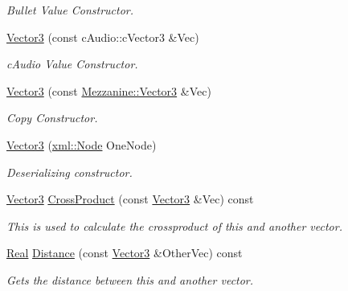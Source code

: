 \begin{DoxyCompactItemize}
\begin{DoxyCompactList}\small\item\em Bullet Value Constructor. \item\end{DoxyCompactList}\item 
\hyperlink{classMezzanine_1_1Vector3_ab6478bd78241583b76a112b6d2c4008f}{Vector3} (const cAudio::cVector3 \&Vec)
\begin{DoxyCompactList}\small\item\em cAudio Value Constructor. \item\end{DoxyCompactList}\item 
\hyperlink{classMezzanine_1_1Vector3_a778d067a1845e7b5fd0a1751c3187901}{Vector3} (const \hyperlink{classMezzanine_1_1Vector3}{Mezzanine::Vector3} \&Vec)
\begin{DoxyCompactList}\small\item\em Copy Constructor. \item\end{DoxyCompactList}\item 
\hyperlink{classMezzanine_1_1Vector3_ac3fb33d2bf5b1e59304bc22eba42c27e}{Vector3} (\hyperlink{classMezzanine_1_1xml_1_1Node}{xml::Node} OneNode)
\begin{DoxyCompactList}\small\item\em Deserializing constructor. \item\end{DoxyCompactList}\item 
\hyperlink{classMezzanine_1_1Vector3}{Vector3} \hyperlink{classMezzanine_1_1Vector3_ad929fbbc2035229f84a3fc8946f7e6c3}{CrossProduct} (const \hyperlink{classMezzanine_1_1Vector3}{Vector3} \&Vec) const 
\begin{DoxyCompactList}\small\item\em This is used to calculate the crossproduct of this and another vector. \item\end{DoxyCompactList}\item 
\hyperlink{namespaceMezzanine_a726731b1a7df72bf3583e4a97282c6f6}{Real} \hyperlink{classMezzanine_1_1Vector3_a712b2063e6aa4c58002628ecf08b15fe}{Distance} (const \hyperlink{classMezzanine_1_1Vector3}{Vector3} \&OtherVec) const 
\begin{DoxyCompactList}\small\item\em Gets the distance between this and another vector. \item\end{DoxyCompactList}\item 

\end{DoxyCompactItemize}
